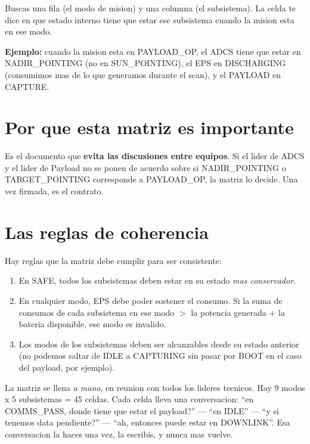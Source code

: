 \documentclass[11pt,a4paper,oneside,openright]{book}
\begin{document}
Buscas una fila (el modo de mision) y una columna (el subsistema).
La celda te dice en que estado interno tiene que estar ese
subsistema cuando la mision esta en ese modo.

\textbf{Ejemplo:} cuando la mision esta en PAYLOAD\_OP, el ADCS
tiene que estar en NADIR\_POINTING (no en SUN\_POINTING), el EPS
en DISCHARGING (consumimos mas de lo que generamos durante el scan),
y el PAYLOAD en CAPTURE.

\section{Por que esta matriz es importante}

Es el documento que \textbf{evita las discusiones entre equipos}. Si
el lider de ADCS y el lider de Payload no se ponen de acuerdo sobre
si NADIR\_POINTING o TARGET\_POINTING corresponde a PAYLOAD\_OP, la
matriz lo decide. Una vez firmada, es el contrato.

\section{Las reglas de coherencia}

Hay reglas que la matriz debe cumplir para ser consistente:

\begin{enumerate}[leftmargin=2em]
  \item En SAFE, todos los subsistemas deben estar en su estado
    \emph{mas conservador}.
  \item En cualquier modo, EPS debe poder sostener el consumo. Si la
    suma de consumos de cada subsistema en ese modo $>$ la potencia
    generada $+$ la bateria disponible, ese modo es invalido.
  \item Los modos de los subsistemas deben ser alcanzables desde su
    estado anterior (no podemos saltar de IDLE a CAPTURING sin pasar
    por BOOT en el caso del payload, por ejemplo).
\end{enumerate}

\begin{intui}
La matriz se llena \emph{a mano}, en reunion con todos los lideres
tecnicos. Hay 9 modos x 5 subsistemas = 45 celdas. Cada celda lleva
una conversacion: ``en COMMS\_PASS, donde tiene que estar el
payload?'' --- ``en IDLE'' --- ``y si tenemos data pendiente?'' ---
``ah, entonces puede estar en DOWNLINK''. Esa conversacion la haces
una vez, la escribis, y nunca mas vuelve.
\end{intui}
\end{document}
